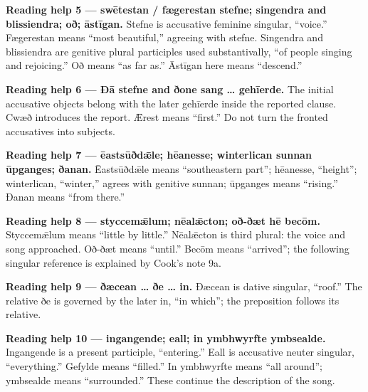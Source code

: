 \textbf{Reading help 5 — swētestan /\allowbreak{} fægerestan stefne; singendra and blissiendra; oð; āstīgan.} Stefne is accusative feminine singular, “voice.” Fægerestan means “most beautiful,” agreeing with stefne. Singendra and blissiendra are genitive plural participles used substantivally, “of people singing and rejoicing.” Oð means “as far as.” Āstīgan here means “descend.”

\textbf{Reading help 6 — Ðā stefne and ðone sang … gehīerde.} The initial accusative objects belong with the later gehīerde inside the reported clause. Cwæð introduces the report. Ǣrest means “first.” Do not turn the fronted accusatives into subjects.

\textbf{Reading help 7 — ēastsūðdǣle; hēanesse; winterlican sunnan ūpganges; ðanan.} Ēastsūðdǣle means “southeastern part”; hēanesse, “height”; winterlican, “winter,” agrees with genitive sunnan; ūpganges means “rising.” Ðanan means “from there.”

\textbf{Reading help 8 — styccemǣlum; nēalǣcton; oð-ðæt hē becōm.} Styccemǣlum means “little by little.” Nēalǣcton is third plural: the voice and song approached. Oð-ðæt means “until.” Becōm means “arrived”; the following singular reference is explained by Cook’s note 9a.

\textbf{Reading help 9 — ðæcean … ðe … in.} Ðæcean is dative singular, “roof.” The relative ðe is governed by the later in, “in which”; the preposition follows its relative.

\textbf{Reading help 10 — ingangende; eall; in ymbhwyrfte ymbsealde.} Ingangende is a present participle, “entering.” Eall is accusative neuter singular, “everything.” Gefylde means “filled.” In ymbhwyrfte means “all around”; ymbsealde means “surrounded.” These continue the description of the song.

